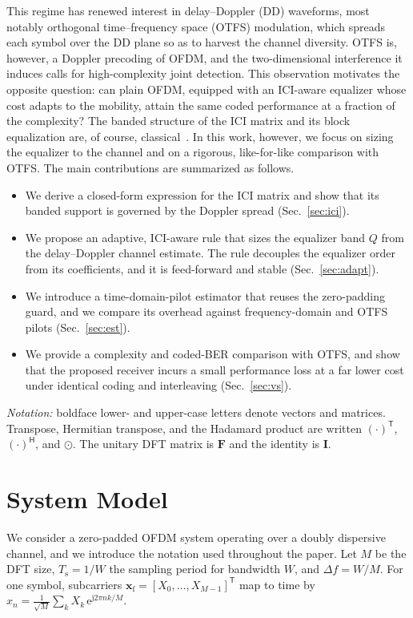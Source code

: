 \documentclass[onecolumn,journal]{IEEEtran}
\theoremstyle{bfhead}
\newcommand{\Ts}{T_{\mathrm{s}}}
\newcommand{\eu}{\mathrm{e}}
\newcommand{\jj}{\mathrm{j}}
\newcommand{\bx}{\bm{x}}
\newcommand{\bF}{\bm{F}}
\newcommand{\bI}{\bm{I}}
\begin{document}
This regime has renewed interest in delay--Doppler (DD) waveforms, most notably
orthogonal time--frequency space (OTFS) modulation, which spreads each symbol over
the DD plane so as to harvest the channel diversity. OTFS is, however, a Doppler
precoding of OFDM, and the two-dimensional interference it induces calls for
high-complexity joint detection. This observation motivates the opposite
question: can plain OFDM, equipped with an ICI-aware equalizer whose cost adapts
to the mobility, attain the same coded performance at a fraction of the
complexity? The banded structure of the ICI matrix and its block equalization are,
of course, classical~\cite{Jeon1999,Cai2003,Rugini2005,Rugini2006}. In this work,
however, we focus on sizing the equalizer to the channel and on a rigorous,
like-for-like comparison with OTFS. The main contributions are summarized as
follows.
\begin{itemize}
\item We derive a closed-form expression for the ICI matrix and show that its
banded support is governed by the Doppler spread (Sec.~\ref{sec:ici}).
\item We propose an adaptive, ICI-aware rule that sizes the equalizer band $Q$
from the delay--Doppler channel estimate. The rule decouples the equalizer order
from its coefficients, and it is feed-forward and stable (Sec.~\ref{sec:adapt}).
\item We introduce a time-domain-pilot estimator that reuses the zero-padding
guard, and we compare its overhead against frequency-domain and OTFS pilots
(Sec.~\ref{sec:est}).
\item We provide a complexity and coded-BER comparison with OTFS, and show that
the proposed receiver incurs a small performance loss at a far lower cost under
identical coding and interleaving (Sec.~\ref{sec:vs}).
\end{itemize}
\emph{Notation:} boldface lower- and upper-case letters denote vectors and
matrices. Transpose, Hermitian transpose, and the Hadamard product are written
$(\cdot)^{\mathsf T}$, $(\cdot)^{\mathsf H}$, and $\odot$. The unitary DFT matrix
is $\bF$ and the identity is $\bI$.

\section{System Model}
We consider a zero-padded OFDM system operating over a doubly dispersive channel,
and we introduce the notation used throughout the paper. Let $M$ be the DFT size,
$\Ts=1/W$ the sampling period for bandwidth $W$, and $\Delta f=W/M$. For one symbol, subcarriers
$\bx_{\mathrm f}=[X_0,\dots,X_{M-1}]^{\mathsf T}$ map to time by
$x_n=\frac{1}{\sqrt M}\sum_k X_k\,\eu^{\jj2\pi nk/M}$.
\end{document}
